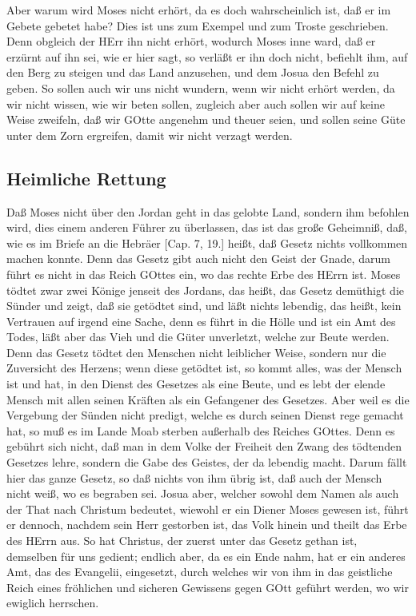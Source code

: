 Aber warum wird Moses nicht erhört, da es doch wahrscheinlich ist, daß er im Gebete gebetet habe? Dies ist uns zum Exempel und zum Troste geschrieben. Denn obgleich der HErr ihn nicht erhört, wodurch Moses inne ward, daß er erzürnt auf ihn sei, wie er hier sagt, so verläßt er ihn doch nicht, befiehlt ihm, auf den Berg zu steigen und das Land anzusehen, und dem Josua den Befehl zu geben. So sollen auch wir uns nicht wundern, wenn wir nicht erhört werden, da wir nicht wissen, wie wir beten sollen, zugleich aber auch sollen wir auf
keine Weise zweifeln, daß wir GOtte angenehm und theuer seien, und sollen seine Güte unter dem Zorn ergreifen, damit wir nicht verzagt werden.

\subsection{Heimliche Rettung}

Daß Moses nicht über den Jordan geht in das gelobte Land, sondern ihm befohlen wird, dies einem anderen Führer zu überlassen, das ist das große Geheimniß, daß, wie es im Briefe an die Hebräer [Cap. 7, 19.] heißt, daß Gesetz nichts vollkommen machen konnte. Denn das Gesetz gibt auch nicht den Geist der Gnade, darum führt es nicht in das Reich GOttes ein, wo das rechte Erbe des HErrn ist. Moses tödtet zwar zwei Könige jenseit des Jordans, das heißt, das Gesetz demüthigt die Sünder und zeigt, daß sie getödtet sind, und läßt nichts lebendig, das heißt, kein Vertrauen auf irgend eine Sache, denn es führt in die Hölle und ist ein Amt des Todes, läßt aber das Vieh und die Güter unverletzt, welche zur Beute werden. Denn das Gesetz tödtet den Menschen nicht leiblicher Weise, sondern nur die Zuversicht des Herzens; wenn diese getödtet ist, so kommt alles, was der Mensch ist und hat, in den Dienst des Gesetzes als eine Beute, und es lebt der elende Mensch mit allen seinen Kräften als ein Gefangener des Gesetzes. Aber weil es die Vergebung der Sünden nicht predigt, welche es durch seinen Dienst rege gemacht hat, so muß es im Lande Moab sterben außerhalb des Reiches GOttes. Denn es gebührt sich nicht, daß man in dem Volke der Freiheit den Zwang des tödtenden Gesetzes lehre, sondern die Gabe des Geistes, der da lebendig macht. Darum fällt hier das ganze Gesetz, so daß nichts von ihm übrig ist, daß auch der Mensch nicht weiß, wo es begraben sei. Josua aber, welcher sowohl dem Namen als auch der That nach Christum bedeutet, wiewohl er ein Diener Moses gewesen ist, führt er dennoch, nachdem sein Herr gestorben ist, das Volk hinein und theilt das Erbe des HErrn aus. So hat Christus, der zuerst unter das Gesetz gethan ist, demselben für uns gedient; endlich aber, da es ein Ende nahm, hat er ein anderes Amt, das des Evangelii, eingesetzt, durch welches wir von ihm in das geistliche Reich eines fröhlichen und sicheren Gewissens gegen GOtt geführt werden, wo wir ewiglich herrschen.

